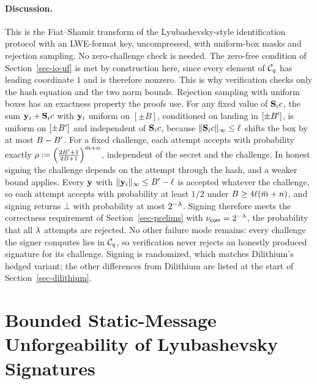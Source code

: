 \paragraph*{Discussion.} This is the Fiat--Shamir transform of the Lyubashevsky-style identification protocol with an LWE-format key, uncompressed, with uniform-box masks and rejection sampling. No zero-challenge check is needed. The zero-free condition of Section~\ref{sec-io-uf} is met by construction here, since every element of $\mathcal{C}_q$ has leading coordinate $1$ and is therefore nonzero. This is why verification checks only the hash equation and the two norm bounds. Rejection sampling with uniform boxes has an exactness property the proofs use. For any fixed value of $\mathbf{S}_ic$, the sum $\mathbf{y}_i + \mathbf{S}_ic$ with $\mathbf{y}_i$ uniform on $[\pm B]$, conditioned on landing in $[\pm B']$, is uniform on $[\pm B']$ and independent of $\mathbf{S}_ic$, because $\|\mathbf{S}_ic\|_\infty \le \ell$ shifts the box by at most $B - B'$. For a fixed challenge, each attempt accepts with probability exactly $\rho := \left(\frac{2B'+1}{2B+1}\right)^{\bar m+n}$, independent of the secret and the challenge. In honest signing the challenge depends on the attempt through the hash, and a weaker bound applies. Every $\mathbf{y}$ with $\|\mathbf{y}_i\|_\infty \le B'-\ell$ is accepted whatever the challenge, so each attempt accepts with probability at least $1/2$ under $B \ge 4\ell(\bar m+n)$, and signing returns $\bot$ with probability at most $2^{-\lambda}$. Signing therefore meets the correctness requirement of Section~\ref{sec-prelims} with $\nu_{\mathsf{corr}} = 2^{-\lambda}$, the probability that all $\lambda$ attempts are rejected. No other failure mode remains: every challenge the signer computes lies in $\mathcal{C}_q$, so verification never rejects an honestly produced signature for its challenge. Signing is randomized, which matches Dilithium's hedged variant; the other differences from Dilithium are listed at the start of Section~\ref{sec-dilithium}.

\section{Bounded Static-Message Unforgeability of Lyubashevsky Signatures} \label{sec-dil-static}

